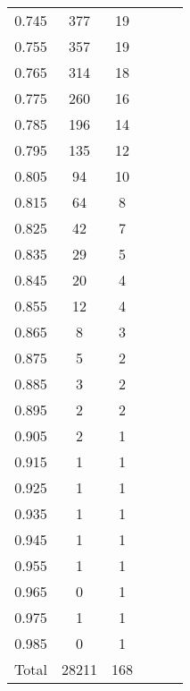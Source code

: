 \begin{center}
\begin{longtable}{c|c|c||c|c|c}
0.745 & 377 & 19\\
0.755 & 357 & 19\\
0.765 & 314 & 18\\
0.775 & 260 & 16\\
0.785 & 196 & 14\\
0.795 & 135 & 12\\
0.805 & 94 & 10\\
0.815 & 64 & 8\\
0.825 & 42 & 7\\
0.835 & 29 & 5\\
0.845 & 20 & 4\\
0.855 & 12 & 4\\
0.865 & 8 & 3\\
0.875 & 5 & 2\\
0.885 & 3 & 2\\
0.895 & 2 & 2\\
0.905 & 2 & 1\\
0.915 & 1 & 1\\
0.925 & 1 & 1\\
0.935 & 1 & 1\\
0.945 & 1 & 1\\
0.955 & 1 & 1\\
0.965 & 0 & 1\\
0.975 & 1 & 1\\
0.985 & 0 & 1\\
\hline
Total & 28211 & 168\\
\hline \hline

\end{longtable}
\end{center}
